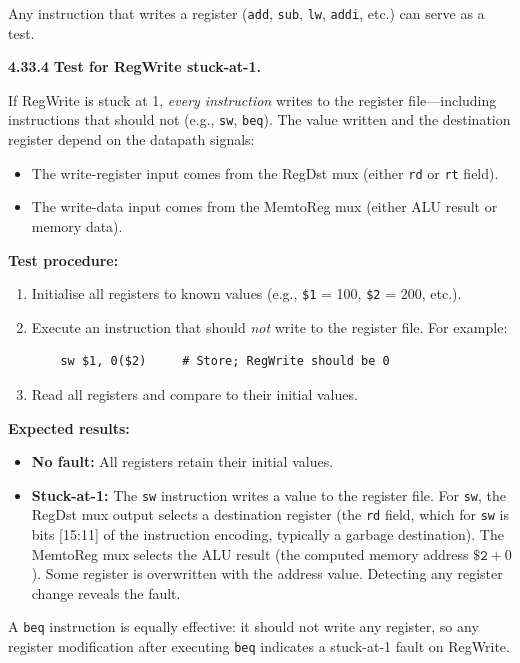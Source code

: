 \noindent Any instruction that writes a register (\texttt{add}, \texttt{sub},
\texttt{lw}, \texttt{addi}, etc.) can serve as a test.

\medskip\noindent\textbf{4.33.4}
\textbf{Test for RegWrite stuck-at-1.}

If RegWrite is stuck at 1, \emph{every instruction} writes to the register
file---including instructions that should not (e.g., \texttt{sw},
\texttt{beq}).  The value written and the destination register depend on the
datapath signals:
\begin{itemize}
\item The write-register input comes from the RegDst mux (either \texttt{rd}
      or \texttt{rt} field).
\item The write-data input comes from the MemtoReg mux (either ALU result or
      memory data).
\end{itemize}

\textbf{Test procedure:}
\begin{enumerate}
\item Initialise all registers to known values (e.g., \texttt{\$1} = 100,
      \texttt{\$2} = 200, etc.).
\item Execute an instruction that should \emph{not} write to the register
      file.  For example:

\begin{verbatim}
    sw $1, 0($2)     # Store; RegWrite should be 0
\end{verbatim}

\item Read all registers and compare to their initial values.
\end{enumerate}

\textbf{Expected results:}
\begin{itemize}
\item \textbf{No fault:} All registers retain their initial values. \checkmark
\item \textbf{Stuck-at-1:} The \texttt{sw} instruction writes a value to
      the register file.  For \texttt{sw}, the RegDst mux output selects a
      destination register (the \texttt{rd} field, which for \texttt{sw} is
      bits [15:11] of the instruction encoding, typically a garbage destination).
      The MemtoReg mux selects the ALU result (the computed memory address
      $\texttt{\$2} + 0$).  Some register is overwritten with the address
      value.  Detecting any register change reveals the fault.
\end{itemize}

\noindent A \texttt{beq} instruction is equally effective: it should not write
any register, so any register modification after executing \texttt{beq}
indicates a stuck-at-1 fault on RegWrite.
